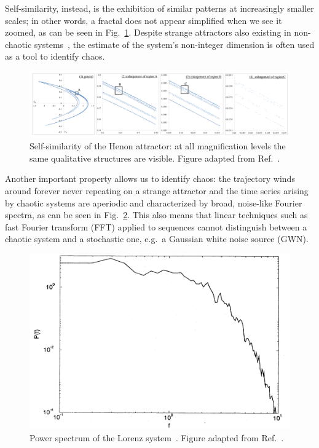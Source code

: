 Self-similarity, instead, is the exhibition of similar patterns at increasingly smaller
scales; in other words, a fractal does not appear simplified when we see it zoomed,
as can be seen in Fig.~\ref{fig: henon fractal}. Despite strange attractors
also existing in non-chaotic systems~\cite{ref:strange_attractors_non_chaotic}, the estimate of the system's non-integer dimension
is often used as a tool to identify chaos.

\begin{figure}[!htbp]
    \centering
    \includegraphics[width=\linewidth]{images/henon_fractal.png}
    \caption{Self-similarity of the Henon attractor: at all magnification levels the same
    qualitative structures are visible. Figure adapted from Ref.~\cite{henon2004two}.
    }\label{fig: henon fractal}
\end{figure}

Another important property allows
us to identify chaos: the trajectory winds around forever never repeating on a
strange attractor and the time series arising by chaotic systems are aperiodic
and characterized by broad, noise-like Fourier spectra, as can be seen in Fig.~\ref{fig: lorenz spectrum}.
This also means that linear techniques
such as fast Fourier transform (FFT) applied to sequences cannot distinguish between a chaotic system
and a stochastic one, e.g.\ a Gaussian white noise source (GWN).

\begin{figure}[!htbp]
    \centering
    \includegraphics[width=.6\linewidth]{images/lorenz_spectrum.png}
    \caption{
        Power spectrum of the Lorenz system~\cite{lorenz1963deterministic}.
        Figure adapted from Ref.~\cite{ref:abarbanel_fourier_spectra}.
    }\label{fig: lorenz spectrum}
\end{figure}

